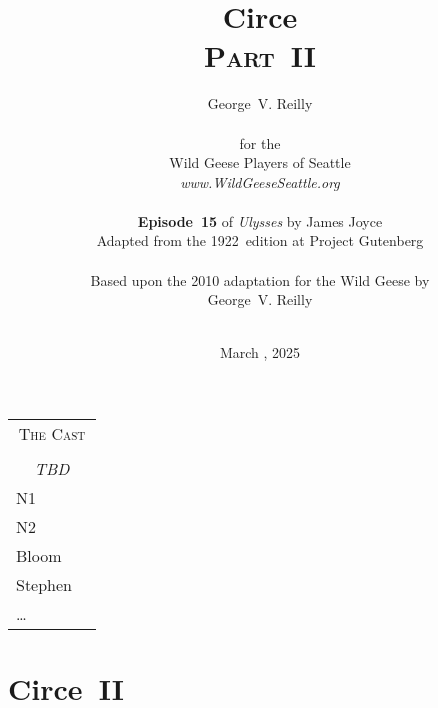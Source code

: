 


\title{\Huge Circe \\
\Large \textsc{Part~II}}
\author{George~V. Reilly\\
\\
{\small for the}\\
Wild Geese Players of Seattle\\
{\textit{www.WildGeeseSeattle.org}}\\
\\
{\small \textbf{Episode~15}
of \textit{Ulysses}
by James Joyce}\\
{\small Adapted from the 1922~edition at Project Gutenberg}
\\
\\
{\small Based upon the 2010 adaptation for the Wild Geese by}\\
{\small George~V. Reilly}
\\
\\
}
\date{March , 2025}
\raggedbottom



\maketitle
\thispagestyle{empty}
\pagebreak

\begin{tabular}{lp{10cm}}
    \multicolumn{2}{c}{\Large \textsc{The Cast}} \\
\\
    \multicolumn{2}{c}{\large \textit{TBD}} \\
N1 \\
N2 \\
Bloom \\
Stephen \\
\ldots
\end{tabular}

\thispagestyle{empty}

\pagebreak

\setcounter{page}{71}
\setcounter{section}{14}  %


\section*{Circe~II}



